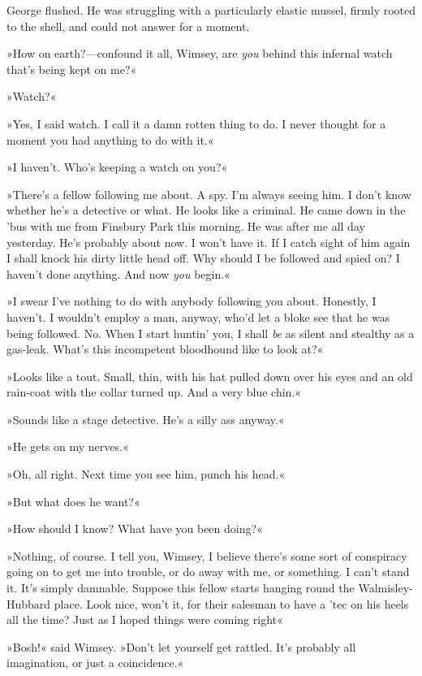 George flushed. He was struggling with a particularly elastic mussel, firmly rooted to the shell, and could not answer for a moment.

»How on earth?—confound it all, Wimsey, are \textit{you} behind this infernal watch that's being kept on me?«

»Watch?«

»Yes, I said watch. I call it a damn rotten thing to do. I never thought for a moment you had anything to do with it.«

»I haven't. Who's keeping a watch on you?«

»There's a fellow following me about. A spy. I'm always seeing him. I don't know whether he's a detective or what. He looks like a criminal. He came down in the 'bus with me from Finsbury Park this morning. He was after me all day yesterday. He's probably about now. I won't have it. If I catch sight of him again I shall knock his dirty little head off. Why should I be followed and spied on? I haven't done anything. And now \textit{you} begin.«

»I swear I've nothing to do with anybody following you about. Honestly, I haven't. I wouldn't employ a man, anyway, who'd let a bloke see that he was being followed. No. When I start huntin' you, I shall \textit{be} as silent and stealthy as a gas-leak. What's this incompetent bloodhound like to look at?«

»Looks like a tout. Small, thin, with his hat pulled down over his eyes and an old rain-coat with the collar turned up. And a very blue chin.«

»Sounds like a stage detective. He's a silly ass anyway.«

»He gets on my nerves.«

»Oh, all right. Next time you see him, punch his head.«

»But what does he want?«

»How should I know? What have you been doing?«

»Nothing, of course. I tell you, Wimsey, I believe there's some sort of conspiracy going on to get me into trouble, or do away with me, or something. I can't stand it. It's simply damnable. Suppose this fellow starts hanging round the Walmisley-Hubbard place. Look nice, won't it, for their salesman to have a 'tec on his heels all the time? Just as I hoped things were coming right\longdash«

»Bosh!« said Wimsey. »Don't let yourself get rattled. It's probably all imagination, or just a coincidence.«

